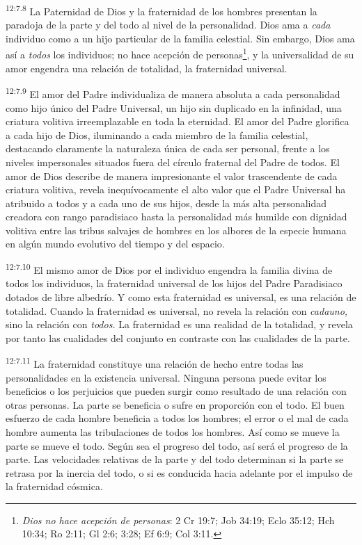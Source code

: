 \par
\textsuperscript{12:7.8} La Paternidad de Dios y la fraternidad de los hombres presentan la paradoja de la parte y del todo al nivel de la personalidad. Dios ama a \textit{cada} individuo como a un hijo particular de la familia celestial. Sin embargo, Dios ama así a \textit{todos} los individuos; no hace acepción de personas\footnote{\textit{Dios no hace acepción de personas}: 2 Cr 19:7; Job 34:19; Eclo 35:12; Hch 10:34; Ro 2:11; Gl 2:6; 3:28; Ef 6:9; Col 3:11.}, y la universalidad de su amor engendra una relación de totalidad, la fraternidad universal.

\par
\textsuperscript{12:7.9} El amor del Padre individualiza de manera absoluta a cada personalidad como hijo único del Padre Universal, un hijo sin duplicado en la infinidad, una criatura volitiva irreemplazable en toda la eternidad. El amor del Padre glorifica a cada hijo de Dios, iluminando a cada miembro de la familia celestial, destacando claramente la naturaleza única de cada ser personal, frente a los niveles impersonales situados fuera del círculo fraternal del Padre de todos. El amor de Dios describe de manera impresionante el valor trascendente de cada criatura volitiva, revela inequívocamente el alto valor que el Padre Universal ha atribuido a todos y a cada uno de sus hijos, desde la más alta personalidad creadora con rango paradisiaco hasta la personalidad más humilde con dignidad volitiva entre las tribus salvajes de hombres en los albores de la especie humana en algún mundo evolutivo del tiempo y del espacio.

\par
\textsuperscript{12:7.10} El mismo amor de Dios por el individuo engendra la familia divina de todos los individuos, la fraternidad universal de los hijos del Padre Paradisiaco dotados de libre albedrío. Y como esta fraternidad es universal, es una relación de totalidad. Cuando la fraternidad es universal, no revela la relación con \textit{cadauno,} sino la relación con \textit{todos.} La fraternidad es una realidad de la totalidad, y revela por tanto las cualidades del conjunto en contraste con las cualidades de la parte.

\par
\textsuperscript{12:7.11} La fraternidad constituye una relación de hecho entre todas las personalidades en la existencia universal. Ninguna persona puede evitar los beneficios o los perjuicios que pueden surgir como resultado de una relación con otras personas. La parte se beneficia o sufre en proporción con el todo. El buen esfuerzo de cada hombre beneficia a todos los hombres; el error o el mal de cada hombre aumenta las tribulaciones de todos los hombres. Así como se mueve la parte se mueve el todo. Según sea el progreso del todo, así será el progreso de la parte. Las velocidades relativas de la parte y del todo determinan si la parte se retrasa por la inercia del todo, o si es conducida hacia adelante por el impulso de la fraternidad cósmica.

